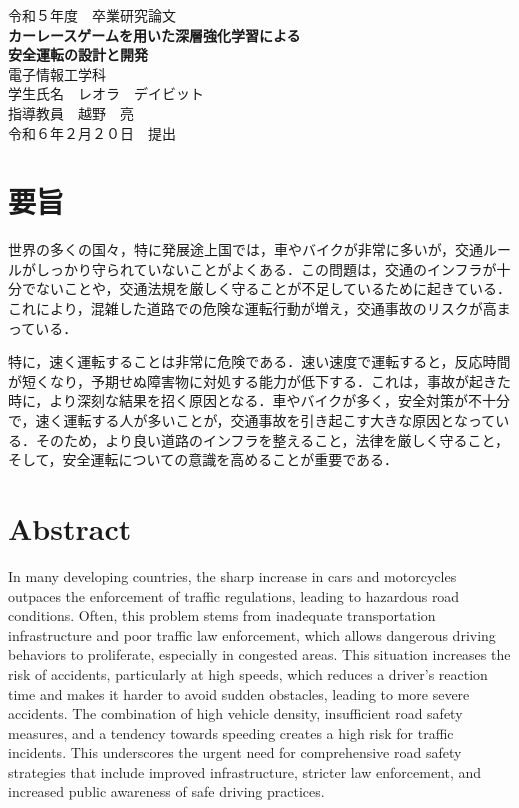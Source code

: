 \documentclass[12pt,a4paper]{article}
\begin{document}
\onehalfspacing


\begin{titlepage}
\centering
\vspace*{60pt}
{\Large 令和５年度　卒業研究論文}\\[50pt]
{\Large \textbf{カーレースゲームを用いた深層強化学習による\\安全運転の設計と開発}}\\[120pt]
{\Large 電子情報工学科}\\[50pt]
{\Large 学生氏名　レオラ　デイビット\\指導教員　越野　亮}\\[50pt]
{\Large 令和６年２月２０日　提出}
\end{titlepage}

\newpage
\section*{要旨}
世界の多くの国々，特に発展途上国では，車やバイクが非常に多いが，交通ルールがしっかり守られていないことがよくある．この問題は，交通のインフラが十分でないことや，交通法規を厳しく守ることが不足しているために起きている．これにより，混雑した道路での危険な運転行動が増え，交通事故のリスクが高まっている．

特に，速く運転することは非常に危険である．速い速度で運転すると，反応時間が短くなり，予期せぬ障害物に対処する能力が低下する．これは，事故が起きた時に，より深刻な結果を招く原因となる．車やバイクが多く，安全対策が不十分で，速く運転する人が多いことが，交通事故を引き起こす大きな原因となっている．そのため，より良い道路のインフラを整えること，法律を厳しく守ること，そして，安全運転についての意識を高めることが重要である．


\section*{Abstract}
In many developing countries, the sharp increase in cars and motorcycles outpaces the enforcement of traffic regulations, leading to hazardous road conditions. Often, this problem stems from inadequate transportation infrastructure and poor traffic law enforcement, which allows dangerous driving behaviors to proliferate, especially in congested areas. This situation increases the risk of accidents, particularly at high speeds, which reduces a driver's reaction time and makes it harder to avoid sudden obstacles, leading to more severe accidents. The combination of high vehicle density, insufficient road safety measures, and a tendency towards speeding creates a high risk for traffic incidents. This underscores the urgent need for comprehensive road safety strategies that include improved infrastructure, stricter law enforcement, and increased public awareness of safe driving practices.
\end{document}
